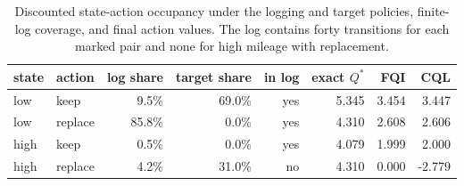 \begin{table}[htbp]
\centering
\caption{Discounted state-action occupancy under the logging and target policies, finite-log coverage, and final action values. The log contains forty transitions for each marked pair and none for high mileage with replacement.}
\label{tab:engine_coverage}
{\small\renewcommand{\arraystretch}{1.12}
\begin{tabular}{llrrrrrr}
\toprule
state & action & log share & target share & in log & exact $Q^*$ & FQI & CQL \\
\midrule
low & keep & 9.5\% & 69.0\% & yes & 5.345 & 3.454 & 3.447 \\
low & replace & 85.8\% & 0.0\% & yes & 4.310 & 2.608 & 2.606 \\
high & keep & 0.5\% & 0.0\% & yes & 4.079 & 1.999 & 2.000 \\
high & replace & 4.2\% & 31.0\% & no & 4.310 & 0.000 & -2.779 \\
\bottomrule
\end{tabular}}
\end{table}

